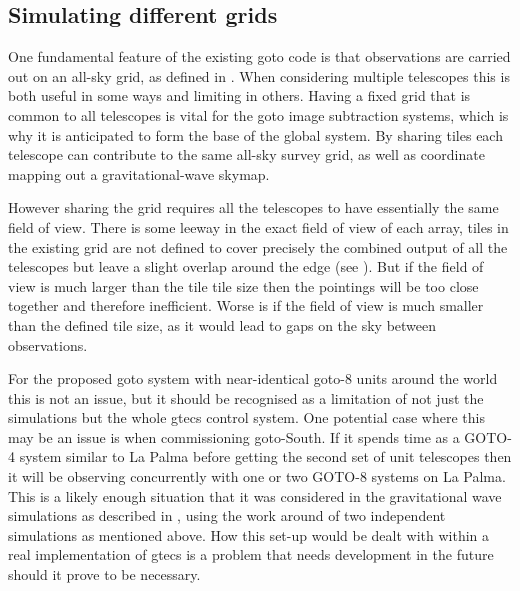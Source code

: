 \begin{colsection}
\begin{colsection}
\end{colsection}


\subsection{Simulating different grids}
\label{sec:multi_grid_scheduling}
\begin{colsection}

One fundamental feature of the existing \gls{goto} code is that observations are carried out on an all-sky grid, as defined in . When considering multiple telescopes this is both useful in some ways and limiting in others. Having a fixed grid that is common to all telescopes is vital for the \gls{goto} image subtraction systems, which is why it is anticipated to form the base of the global system. By sharing tiles each telescope can contribute to the same all-sky survey grid, as well as coordinate mapping out a gravitational-wave skymap.

However sharing the grid requires all the telescopes to have essentially the same field of view. There is some leeway in the exact field of view of each array, tiles in the existing grid are not defined to cover precisely the combined output of all the telescopes but leave a slight overlap around the edge (see ). But if the field of view is much larger than the tile tile size then the pointings will be too close together and therefore inefficient. Worse is if the field of view is much smaller than the defined tile size, as it would lead to gaps on the sky between observations.

For the proposed \gls{goto} system with near-identical \gls{goto}-8 units around the world this is not an issue, but it should be recognised as a limitation of not just the simulations but the whole \gls{gtecs} control system. One potential case where this may be an issue is when commissioning \gls{goto}-South. If it spends time as a GOTO-4 system similar to La Palma before getting the second set of unit telescopes then it will be observing concurrently with one or two GOTO-8 systems on La Palma. This is a likely enough situation that it was considered in the gravitational wave simulations as described in , using the work around of two independent simulations as mentioned above. How this set-up would be dealt with within a real implementation of \gls{gtecs} is a problem that needs development in the future should it prove to be necessary.

\end{colsection}


\end{colsection}

